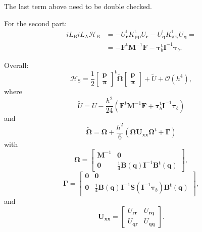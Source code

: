 \documentclass[
journal=jctcce,
layout=twocolumn
]{achemso}
\newcommand{\mt}[1]{\boldsymbol{\mathbf{#1}}}   %
\newcommand{\vt}[1]{\boldsymbol{\mathbf{#1}}}   %
\newcommand{\tr}[1]{#1^\text{t}}                %
\newcommand{\Ham}[1]{{\mathcal H}_\text{#1}}    %
\newcommand{\Liu}[1]{i\!L_\text{#1}}            %
\newcommand{\timestep}{h}
\begin{document}
The last term above need to be double checked.

For the second part:
\begin{align*}
\Liu B \Liu A \Ham B &= -\tr{U_{\vt r}} \tr{K_{\vt p \vt p}} U_{\vt r} - \tr{U_{\vt q}} \tr{K_{\vt \pi \vt \pi}} U_{\vt q} = \\
&= -\tr{\vt F} {\mt M}^{-1} {\vt F} - \tr{\vt \tau}_b {\mt I}^{-1} {\vt \tau}_b.
\end{align*}

Overall:
\begin{equation*}
\Ham S = \frac{1}{2} \tr{\left[\begin{array}{c} \vt p \\ \vt \pi \end{array}\right]} \tilde{\mt \Omega} \left[\begin{array}{c} \vt p \\ \vt \pi \end{array}\right] + \tilde{U} + \mathcal{O}({\timestep}^4),
\end{equation*}
where
\begin{equation*}
\tilde{U} = U - \frac{\timestep^2}{24} \left( \tr{\vt F} {\mt M}^{-1} {\vt F} + \tr{\vt \tau}_b {\mt I}^{-1} {\vt \tau}_b \right)
\end{equation*}
and
\begin{equation*}
\tilde{\mt \Omega} = {\mt \Omega} + \frac{\timestep^2}{6} \left( {\mt \Omega} {\mt U}_{\vt x \vt x} \tr{\mt \Omega} + {\mt \Gamma} \right)
\end{equation*}
with
\begin{equation*}
\mt \Omega = \left[\begin{array}{cc}
{\mt M}^{-1} & \mt 0 \\
\mt 0 & \frac{1}{4} {\mt B}(\vt q) {\mt I}^{-1} \tr{\mt B}(\vt q)
\end{array}\right],
\end{equation*}
\begin{equation*}
\mt \Gamma = \left[\begin{array}{cc}
\mt 0 & \mt 0 \\
\mt 0 & \frac{1}{4} {\mt B}(\vt q) {\mt I}^{-1} {\mt S}({\mt I}^{-1} {\vt \tau}_b) \tr{\mt B}(\vt q)
\end{array}\right],
\end{equation*}
and
\begin{equation*}
{\mt U}_{\vt x \vt x} = \left[\begin{array}{cc}
U_{\vt r \vt r} & U_{\vt r \vt q} \\
U_{\vt q \vt r} & U_{\vt q \vt q}
\end{array}\right].
\end{equation*}
\end{document}
